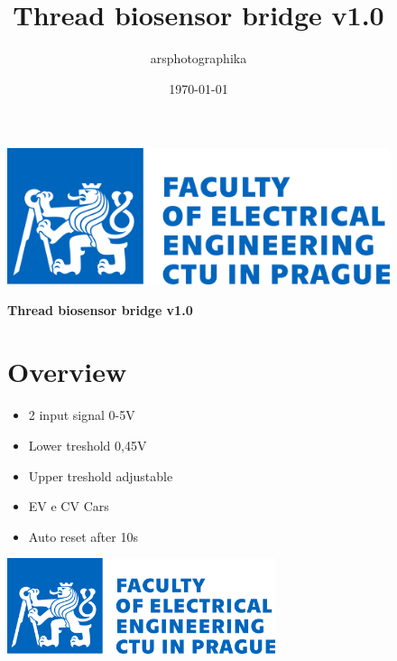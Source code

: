 \documentclass[a4paper,12pt,oneside,pdflatex,italian,final]{article}
\title{Thread biosensor bridge v1.0}
\author{arsphotographika }
\date{\today}
\begin{document}
\pagestyle{fancy}

\chead {\today}

\begin{figure}
\begin{minipage}{0.47\textwidth}
\centering
\includegraphics[width=.7\textwidth,left,]{logo.jpg}

\end{minipage}
\hfill
\begin{minipage}{0.47\textwidth}
\raggedleft
\Huge \textbf{Thread biosensor bridge v1.0}
\end{minipage}
\end{figure}


\begin{figure}
\begin{minipage}{0.47\textwidth}

\section{Overview}
    \begin{itemize}
        \item 2 input signal 0-5V
        \item Lower treshold 0,45V
        \item Upper treshold adjustable
        \item EV e CV Cars
        \item Auto reset after 10s
    \end{itemize}


\end{minipage}
\hfill
\begin{minipage}{0.47\textwidth}
\centering
\includegraphics[width=0.7\textwidth,right]{logo.jpg}

\end{minipage}
\end{figure}
\end{document}
